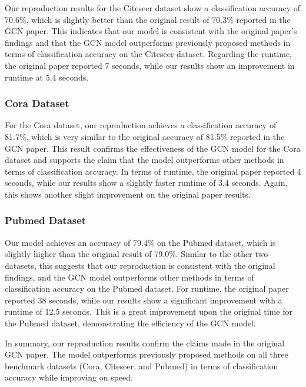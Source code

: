 \documentclass[11pt,a4paper]{article}
\begin{document}
Our reproduction results for the Citeseer dataset show a classification accuracy of 70.6\%, which is slightly better than the original result of 70.3\% reported in the GCN paper. This indicates that our model is consistent with the original paper's findings and that the GCN model outperforms previously proposed methods in terms of classification accuracy on the Citeseer dataset. Regarding the runtime, the original paper reported 7 seconds, while our results show an improvement in runtime at 5.4 seconds.

\subsubsection{Cora Dataset}

For the Cora dataset, our reproduction achieves a classification accuracy of 81.7\%, which is very similar to the original accuracy of 81.5\% reported in the GCN paper. This result confirms the effectiveness of the GCN model for the Cora dataset and supports the claim that the model outperforms other methods in terms of classification accuracy. In terms of runtime, the original paper reported 4 seconds, while our results show a slightly faster runtime of 3.4 seconds. Again, this shows another slight improvement on the original paper results.

\subsubsection{Pubmed Dataset}

Our model achieves an accuracy of 79.4\% on the Pubmed dataset, which is slightly higher than the original result of 79.0\%. Similar to the other two datasets, this suggests that our reproduction is consistent with the original findings, and the GCN model outperforms other methods in terms of classification accuracy on the Pubmed dataset. For runtime, the original paper reported 38 seconds, while our results show a significant improvement with a runtime of 12.5 seconds. This is a great improvement upon the original time for the Pubmed dataset, demonstrating the efficiency of the GCN model.

In summary, our reproduction results confirm the claims made in the original GCN paper. The model outperforms previously proposed methods on all three benchmark datasets (Cora, Citeseer, and Pubmed) in terms of classification accuracy while improving on speed.

\end{document}
